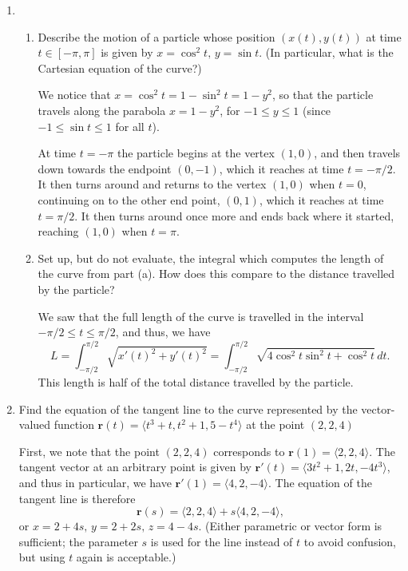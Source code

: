 \documentclass[12pt]{article}
\newcommand{\points}[1]{\marginpar{\hspace{24pt}[#1]}}
\begin{document}
\begin{enumerate}
\item \begin{enumerate}
\item Describe the motion of a particle whose position $(x(t),y(t))$ at time $t\in [-\pi,\pi]$ is given by $x=\cos^2 t,\, y=\sin t$. (In particular, what is the Cartesian equation of the curve?) \points{6}

\bigskip

We notice that $x=\cos^2 t = 1-\sin^2t = 1-y^2$, so that the particle travels along the parabola $x=1-y^2$, for $-1\leq y\leq 1$ (since $-1\leq \sin t\leq 1$ for all $t$).

At time $t=-\pi$ the particle begins at the vertex $(1,0)$, and then travels down towards the endpoint $(0,-1)$, which it reaches at time $t=-\pi/2$. It then turns around and returns to the vertex $(1,0)$ when $t=0$, continuing on to the other end point, $(0,1)$, which it reaches at time $t=\pi/2$. It then turns around once more and ends back where it started, reaching $(1,0)$ when $t=\pi$.

\vspace{0.5in}


\item Set up, but do not evaluate, the integral which computes the length of the curve from part (a). How does this compare to the distance travelled by the particle? \points{4}

\bigskip

We saw that the full length of the curve is travelled in the interval $-\pi/2\leq t\leq \pi/2$, and thus, we have
\[
L = \int_{-\pi/2}^{\pi/2}\sqrt{x'(t)^2+y'(t)^2} = \int_{-\pi/2}^{\pi/2}\sqrt{4\cos^2t\sin^2t+\cos^2t}\,dt.
\]
This length is half of the total distance travelled by the particle.

\vspace{0.5in}

\end{enumerate}
\item Find the equation of the tangent line to the curve represented by the vector-valued function $\mathbf{r}(t) = \langle t^3+t,t^2+1,5-t^4\rangle$ at the point $(2,2,4)$ \points{4}

\bigskip

First, we note that the point $(2,2,4)$ corresponds to $\mathbf{r}(1) = \langle 2,2,4\rangle$. The tangent vector at an arbitrary point is given by $\mathbf{r}'(t) = \langle 3t^2+1,2t,-4t^3\rangle$, and thus in particular, we have $\mathbf{r}'(1) = \langle 4, 2, -4\rangle$. The equation of the tangent line is therefore
\[
\mathbf{r}(s) = \langle 2,2,4\rangle +s\langle 4,2,-4\rangle,
\]
or $x=2+4s,\,y=2+2s,\, z=4-4s$. (Either parametric or vector form is sufficient; the parameter $s$ is used for the line instead of $t$ to avoid confusion, but using $t$ again is acceptable.)
\newpage


\end{enumerate}
\end{document}
